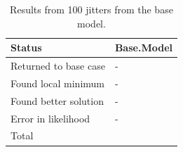 \documentclass[12pt,]{article}
\begin{document}
\FloatBarrier

\begin{table}[ht]
\centering
\caption{Results from 100 jitters from the base model.} 
\label{tab:jitter}
\begin{tabular}{>{\raggedright}p{2in}>{\centering}p{1in}}
  \hline
Status & Base.Model \\ 
  \hline
Returned to base case & - \\ 
  Found local minimum & - \\ 
  Found better solution & - \\ 
  Error in likelihood & - \\ 
  Total & 100 \\ 
   \hline
\end{tabular}
\end{table}

\FloatBarrier
\end{document}
